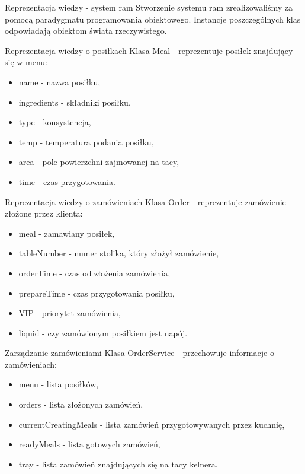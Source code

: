 \documentclass[a4paper,10pt]{beamer}
\begin{document}
		\begin{frame}{Reprezentacja wiedzy - system ram}
			Stworzenie systemu ram zrealizowaliśmy za pomocą paradygmatu programowania obiektowego. Instancje poszczególnych klas odpowiadają obiektom świata rzeczywistego.
		\end{frame}
		\begin{frame}{Reprezentacja wiedzy o posiłkach}
			Klasa Meal - reprezentuje posiłek znajdujący się w menu:
			\begin{itemize}
				\item name - nazwa posiłku,
				\item ingredients - składniki posiłku,
				\item type - konsystencja,
				\item temp - temperatura podania posiłku,
				\item area - pole powierzchni zajmowanej na tacy,
				\item time - czas przygotowania. 
			\end{itemize}
		\end{frame}
		\begin{frame}{Reprezentacja wiedzy o zamówieniach}
			Klasa Order - reprezentuje zamówienie złożone przez klienta:
			\begin{itemize}
				\item meal - zamawiany posiłek,
				\item tableNumber - numer stolika, który złożył zamówienie,
				\item orderTime - czas od złożenia zamówienia,
				\item prepareTime - czas przygotowania posiłku,
				\item VIP - priorytet zamówienia,
				\item liquid - czy zamówionym posiłkiem jest napój.
			\end{itemize}
		\end{frame}
		\begin{frame}{Zarządzanie zamówieniami}
			Klasa OrderService - przechowuje informacje o zamówieniach:
			\begin{itemize}
				\item menu - lista posiłków,
				\item orders - lista złożonych zamówień,
				\item currentCreatingMeals - lista zamówień przygotowywanych przez kuchnię,
				\item readyMeals - lista gotowych zamówień,
				\item tray - lista zamówień znajdujących się na tacy kelnera.
			\end{itemize}
		\end{frame}
		
\end{document}
